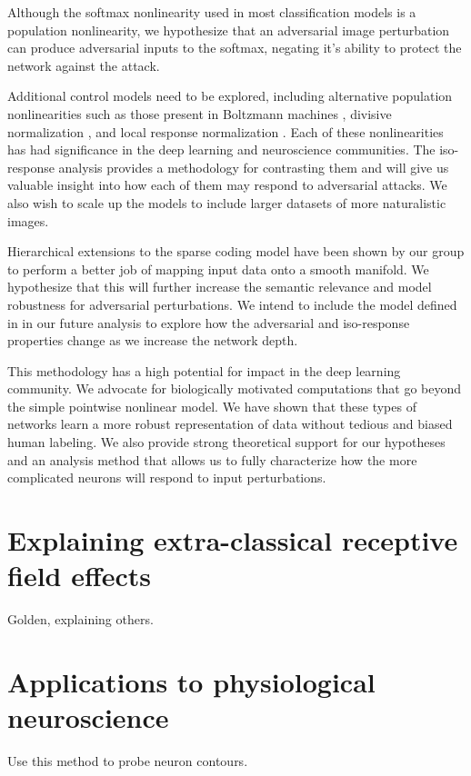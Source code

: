 Although the softmax nonlinearity used in most classification models is a population nonlinearity, we hypothesize that an adversarial image perturbation can produce adversarial inputs to the softmax, negating it's ability to protect the network against the attack.

Additional control models need to be explored, including alternative population nonlinearities such as those present in Boltzmann machines \cite{salakhutdinov2009deep}, divisive normalization \cite{balle2016end}, and local response normalization \cite{krizhevsky2012imagenet}. Each of these nonlinearities has had significance in the deep learning and neuroscience communities. The iso-response analysis provides a methodology for contrasting them and will give us valuable insight into how each of them may respond to adversarial attacks. We also wish to scale up the models to include larger datasets of more naturalistic images. 

Hierarchical extensions to the sparse coding model \cite{chen2018sparse} have been shown by our group to perform a better job of mapping input data onto a smooth manifold. We hypothesize that this will further increase the semantic relevance and model robustness for adversarial perturbations. We intend to include the model defined in \cite{chen2018sparse} in our future analysis to explore how the adversarial and iso-response properties change as we increase the network depth.

This methodology has a high potential for impact in the deep learning community. We advocate for biologically motivated computations that go beyond the simple pointwise nonlinear model. We have shown that these types of networks learn a more robust representation of data without tedious and biased human labeling. We also provide strong theoretical support for our hypotheses and an analysis method that allows us to fully characterize how the more complicated neurons will respond to input perturbations.

\section{Explaining extra-classical receptive field effects}
Golden, explaining others.


\section{Applications to physiological neuroscience}
Use this method to probe neuron contours.
